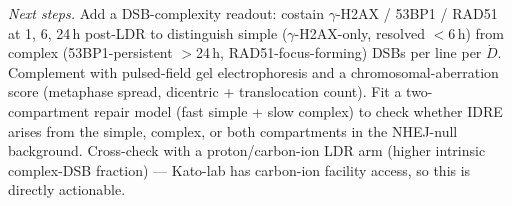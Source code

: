 \begin{enumerate}
  \emph{Next steps.} Add a DSB-complexity readout: costain $\gamma$-H2AX / 53BP1 / RAD51 at
  1, 6, 24\,h post-LDR to distinguish simple ($\gamma$-H2AX-only, resolved $<$6\,h) from
  complex (53BP1-persistent $>$24\,h, RAD51-focus-forming) DSBs per line per $\dot D$.
  Complement with pulsed-field gel electrophoresis and a chromosomal-aberration score
  (metaphase spread, dicentric + translocation count). Fit a two-compartment repair model
  (fast simple + slow complex) to check whether IDRE arises from the simple, complex, or both
  compartments in the NHEJ-null background. Cross-check with a proton/carbon-ion LDR arm
  (higher intrinsic complex-DSB fraction) --- Kato-lab has carbon-ion facility access, so this
  is directly actionable.

\end{enumerate}
